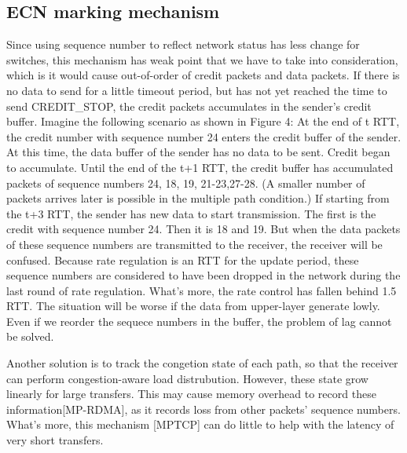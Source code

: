 \documentclass[conference,compsoc]{IEEEtran}
\begin{document}
\subsection{ECN marking mechanism}
Since using sequence number to reflect network status has less change for switches, this mechanism has weak point that we have to take into consideration, which is it would cause out-of-order of credit packets and data packets. If there is no data to send for a little timeout period, but has not yet reached the time to send CREDIT\_STOP, the credit packets accumulates in the sender's credit buffer. Imagine the following scenario as shown in Figure 4: At the end of t RTT, the credit number with sequence number 24 enters the credit buffer of the sender. At this time, the data buffer of the sender has no data to be sent. Credit began to accumulate. Until the end of the t+1 RTT, the credit buffer has accumulated packets of sequence numbers 24, 18, 19, 21-23,27-28. (A smaller number of packets arrives later is possible in the multiple path condition.) If starting from the t+3 RTT, the sender has new data to start transmission. The first is the credit with sequence number 24. Then it is 18 and 19. But when the data packets of these sequence numbers are transmitted to the receiver, the receiver will be confused. Because rate regulation is an RTT for the update period, these sequence numbers are considered to have been dropped in the network during the last round of rate regulation. What's more, the rate control has fallen behind 1.5 RTT.  The situation will be worse if the data from upper-layer generate lowly. Even if we reorder the sequece numbers in the buffer, the problem of lag cannot be solved.

Another solution is to track the congetion state of each path, so that the receiver can perform congestion-aware load distrubution. However, these state grow linearly for large transfers. This may cause memory overhead to record these information[MP-RDMA], as it records loss from other packets' sequence numbers. What's more, this mechanism [MPTCP] can do little to help with the latency of very short transfers.
\end{document}
